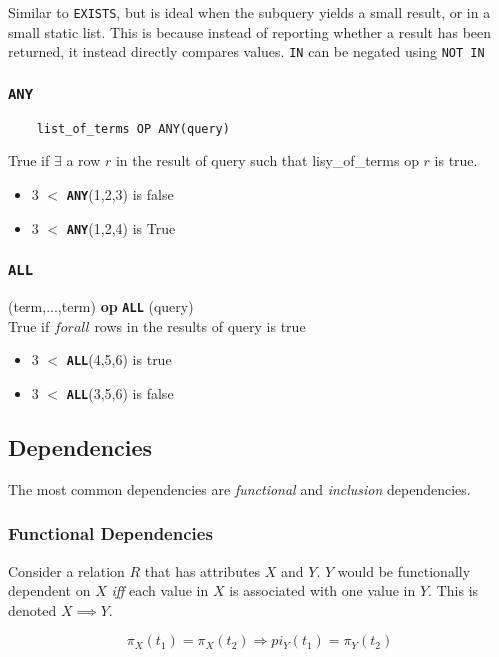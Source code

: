 \documentclass{article}
\begin{document}
Similar to \texttt{EXISTS}, but is ideal when the subquery yields a small result, or in a small static list. This is because instead of reporting whether a result has been returned, it instead directly compares values.
\texttt{IN} can be negated using \texttt{NOT IN}

\subsubsection*{\texttt{ANY}}
\begin{lstlisting}
    list_of_terms OP ANY(query)
  \end{lstlisting}
True if $\exists$ a row $r$ in the result of query such that lisy\_of\_terms op $r$ is true.
\begin{itemize}
  \item 3 $<$ \texttt{\textbf{ANY}}({1,2,3}) is false
  \item 3 $<$ \texttt{\textbf{ANY}}({1,2,4}) is True
\end{itemize}

\subsubsection*{\texttt{ALL}}
(term,...,term) \textbf{op} \texttt{\textbf{ALL}} (query)\\
True if $forall$ rows in the results of query is true
\begin{itemize}
  \item 3 $<$ \texttt{\textbf{ALL}}(4,5,6) is true
  \item 3 $<$ \texttt{\textbf{ALL}}(3,5,6) is false
\end{itemize}

\subsection{Dependencies}

The most common dependencies are \textit{functional} and \textit{inclusion} dependencies.

\subsubsection*{Functional Dependencies}

Consider a relation $R$ that has attributes $X$ and $Y$. $Y$ would be functionally dependent on $X$ \textit{iff} each value in $X$ is associated with one value in $Y$. This is denoted $X \implies Y$.

$$\pi_X(t_1) = \pi_X(t_2) \Rightarrow pi_Y(t_1) = \pi_Y(t_2)$$
\end{document}
